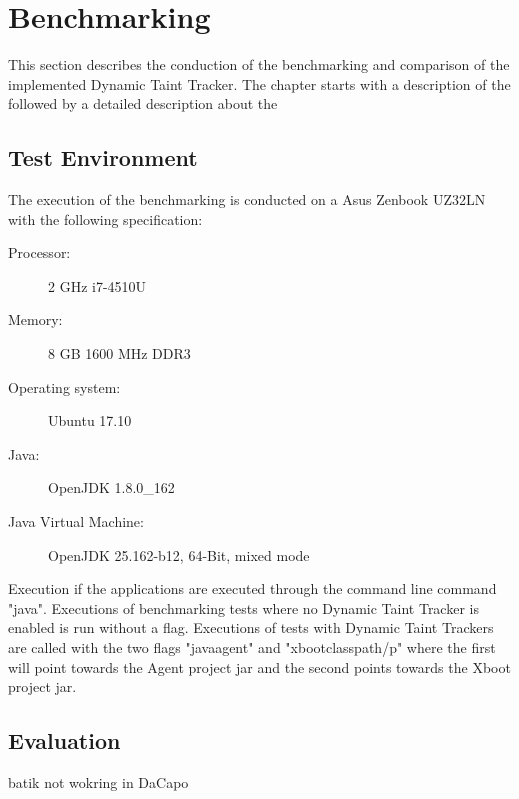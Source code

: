 \chapter{Benchmarking}
This section describes the conduction of the benchmarking and comparison of the implemented Dynamic Taint Tracker. The chapter starts with a description of the \textit{} followed by a detailed description about the \textit{}

\section{Test Environment}
\label{TestEnvironment}
The execution of the benchmarking is conducted on a Asus Zenbook UZ32LN with the following specification:

\hfill
\begin{description}
	\item [Processor:] 2 GHz i7-4510U
	\item [Memory:] 8 GB 1600 MHz DDR3
	\item [Operating system:] Ubuntu 17.10
	\item [Java:] OpenJDK 1.8.0\_162
	\item [Java Virtual Machine:] OpenJDK 25.162-b12, 64-Bit, mixed mode
\end{description}
\hfill

Execution if the applications are executed through the command line command "java". Executions of benchmarking tests where no Dynamic Taint Tracker is enabled is run without a flag. Executions of tests with Dynamic Taint Trackers are called with the two flags "javaagent" and "xbootclasspath/p" where the first will point towards the Agent project jar and the second points towards the Xboot project jar.


\section{Evaluation}
\label{Evaluation}


batik not wokring in DaCapo